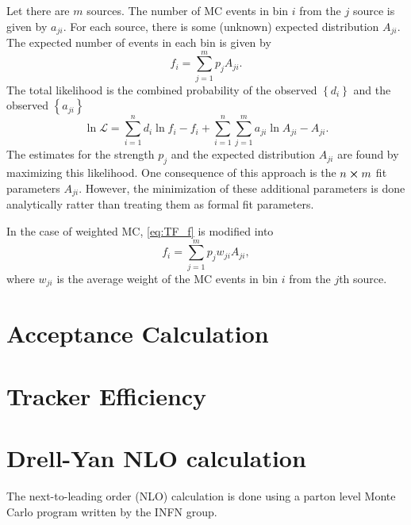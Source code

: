 \documentclass[../main.tex]{subfiles}
\begin{document}
Let there are $m$ sources. The number of MC events in bin $i$ from the $j$ source
is given by $a_{ji}$. For each source, there is some (unknown) expected distribution
$A_{ji}$. The expected number of events in each bin is given by
\begin{equation}
	f_i = \sum^m_{j=1} p_j A_{ji}.
	\label{eq:TF_f}
\end{equation}
The total likelihood is the combined probability of the observed $\left\{d_i\right\}$
and the observed $\left\{a_{ji}\right\}$
\begin{equation}
	\ln \mathcal{L} = \sum^n_{i=1} d_i \ln f_i -f_i + \sum^n_{i=1} \sum^m_{j=1} a_{ji} \ln A_{ji} - A_{ji}.
	\label{eq:TF_likelihood}
\end{equation}
The estimates for the strength $p_j$ and the expected distribution $A_{ji}$ are
found by maximizing this likelihood. One consequence of this approach is the
$n \cross m$ fit parameters $A_{ji}$. However, the  minimization of these additional
parameters is done analytically ratter than treating them as formal fit parameters.

In the case of weighted MC, \cref{eq:TF_f} is modified into
\begin{equation}
	f_i = \sum^m_{j=1} p_j w_{ji}A_{ji},
\end{equation}
where $w_{ji}$ is the average weight of the MC events in bin $i$ from the $j$th source.

\section{Acceptance Calculation}

\section{Tracker Efficiency}

\section{Drell-Yan NLO calculation}
The next-to-leading order (NLO) calculation is done using a parton level Monte
Carlo program written by the INFN group\cite{catani2009,catani2007}.

\ifSubfilesClassLoaded{ \printbibliography[heading=bibintoc,title={References}]}{}
\end{document}
